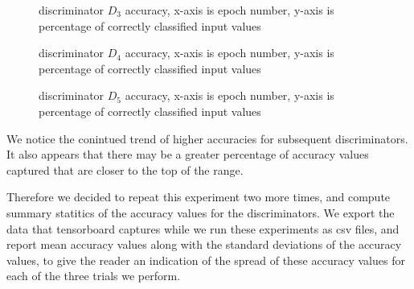\documentclass[conference]{IEEEtran}
\begin{document}
\begin{figure}[htpb]
\caption{discriminator $D_{3}$ accuracy, x-axis is epoch number, y-axis is 
percentage of correctly classified input values }
\label{disc3Acc}
\end{figure}

\begin{figure}[htpb]
\caption{discriminator $D_{4}$ accuracy, x-axis is epoch number, y-axis is 
percentage of correctly classified input values }
\label{disc4Acc}
\end{figure}

\begin{figure}[htpb]
\caption{discriminator $D_{5}$ accuracy, x-axis is epoch number, y-axis is 
percentage of correctly classified input values }
\label{disc5Acc}
\end{figure}

We notice the conintued trend of higher accuracies for subsequent
discriminators. It also appears that there may be a greater percentage of
accuracy values captured that are closer to the top of the range.

Therefore we decided to repeat this experiment two more times, and compute
summary statitics of the accuracy values for the discriminators.  We export
the data that tensorboard captures while we run these experiments as csv files,
and report mean accuracy values along with the standard deviations of the
accuracy values, to give the reader an indication of the spread of these
accuracy values for each of the three trials we perform.
\end{document}

